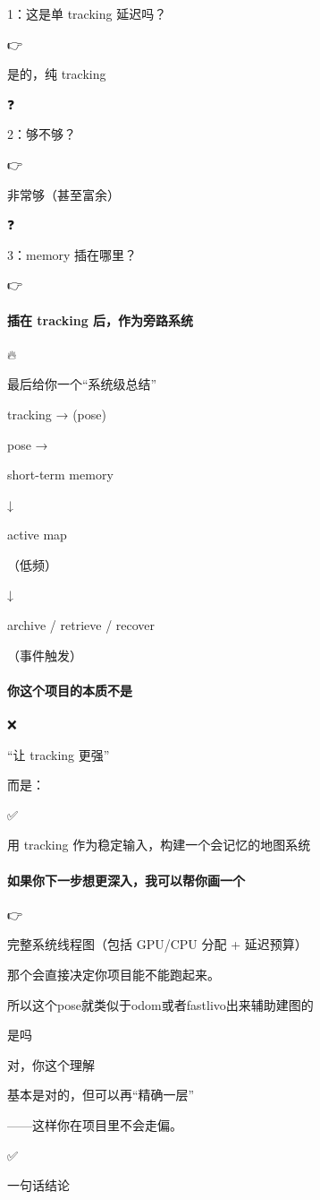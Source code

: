 \documentclass[12pt]{article}
\begin{document}
1：这是单 tracking 延迟吗？

👉

是的，纯 tracking

❓

2：够不够？

👉

非常够（甚至富余）

❓

3：memory 插在哪里？

👉

\paragraph{插在 tracking 后，作为旁路系统}
🔥

最后给你一个“系统级总结”

tracking → (pose)

pose →

short-term memory

↓

active map

（低频）

↓

archive / retrieve / recover

（事件触发）

\paragraph{你这个项目的本质不是}
❌

“让 tracking 更强”

而是：

✅

用 tracking 作为稳定输入，构建一个会记忆的地图系统

\paragraph{如果你下一步想更深入，我可以帮你画一个}
👉

完整系统线程图（包括 GPU/CPU 分配 + 延迟预算）

那个会直接决定你项目能不能跑起来。

所以这个pose就类似于odom或者fastlivo出来辅助建图的

是吗

对，你这个理解

基本是对的，但可以再“精确一层”

——这样你在项目里不会走偏。

✅

一句话结论
\end{document}
